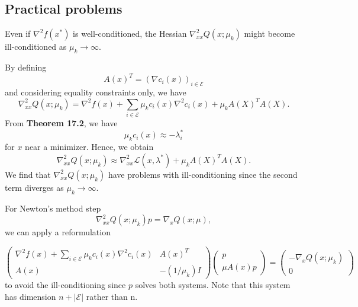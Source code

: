 \documentclass[11pt,a4paper]{article}
\renewcommand{\(}{\left(}
\renewcommand{\)}{\right)}
\begin{document}
\subsection*{Practical problems}
Even if $\nabla^2f(x^*)$ is well-conditioned, the Hessian $\nabla^2_{xx}Q(x;\mu_k)$ might become ill-conditioned as $\mu_k \rightarrow \infty$. 

By defining $$A(x)^T = (\nabla c_i(x))_{i \in \mathcal{E}}$$ and considering equality constraints only, we have
$$\nabla^2_{xx}Q(x;\mu_k) = \nabla^2f(x)+\sum_{i \in \mathcal{E}}\mu_kc_i(x)\nabla^2 c_i(x) + \mu_kA(X)^TA(X).
$$
From \textbf{Theorem 17.2}, we have $$\mu_kc_i(x)\approx -\lambda^*_i$$ for $x$ near a minimizer.
Hence, we obtain $$\nabla^2_{xx}Q(x;\mu_k) \approx \nabla^2_{xx}\mathcal{L}(x,\lambda^*) + \mu_kA(X)^TA(X).$$
We find that $\nabla^2_{xx}Q(x;\mu_k)$ have problems with ill-conditioning since the second term diverges as $\mu_k \rightarrow \infty$. 

For Newton's method step
$$
\nabla^2_{xx}Q(x;\mu_k)p = \nabla_{x}Q(x;\mu),
$$ we can apply a reformulation

\[
\begin{pmatrix}
	\nabla^2f(x)+\sum_{i \in \mathcal{E}}\mu_kc_i(x)\nabla^2 c_i(x) & A(x)^T\\
	A(x) & -(1/\mu_k)I
\end{pmatrix}
\begin{pmatrix} p \\ \mu A(x)p \end{pmatrix}
=
\begin{pmatrix} -\nabla_xQ(x;\mu_k)\\ 0 \end{pmatrix}
\]
to avoid the ill-conditioning since $p$ solves both systems. Note that this system has dimension $n+|\mathcal{E}|$ rather than
n.
\end{document}
